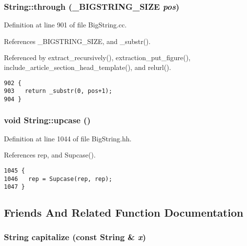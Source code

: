 \subsubsection{ String::through ({\bf \_\-BIGSTRING\_\-SIZE} {\em pos})}\label{classString_a64}




Definition at line 901 of file Big\-String.cc.

References \_\-BIGSTRING\_\-SIZE, and \_\-substr().

Referenced by extract\_\-recursively(), extraction\_\-put\_\-figure(), include\_\-article\_\-section\_\-head\_\-template(), and relurl().



\footnotesize\begin{verbatim}902 {
903   return _substr(0, pos+1);
904 }
\end{verbatim}\normalsize 
{}
\subsubsection{\setlength{\rightskip}{0pt plus 5cm}void String::upcase ()\hspace{0.3cm}{\tt  [inline]}}\label{classString_a95}




Definition at line 1044 of file Big\-String.hh.

References rep, and Supcase().



\footnotesize\begin{verbatim}1045 {
1046   rep = Supcase(rep, rep);
1047 }
\end{verbatim}\normalsize 


\subsection{Friends And Related Function Documentation}
\subsubsection{\setlength{\rightskip}{0pt plus 5cm}String capitalize (const String \& {\em x})\hspace{0.3cm}{\tt  [friend]}}\label{classString_l47}




